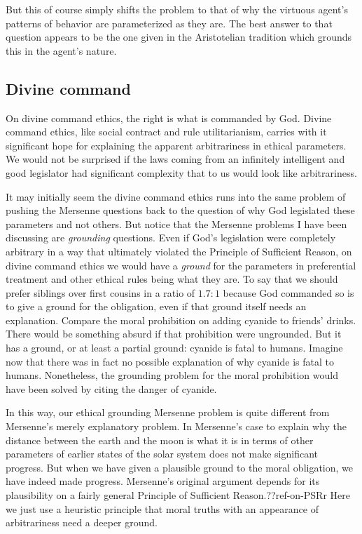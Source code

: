 But this of course simply shifts the problem to that of why the virtuous agent's patterns of behavior are parameterized as
they are. The best answer to that question appears to be the one given in the Aristotelian tradition which grounds this in
the agent's nature.

\subsection{Divine command}
On divine command ethics, the right is what is commanded by God.
Divine command ethics, like social contract and rule utilitarianism, carries with it significant hope for explaining the apparent
arbitrariness in ethical parameters. We would not be surprised if the laws coming from an infinitely intelligent and good legislator 
had significant complexity that to us would look like arbitrariness. 

It may initially seem the divine command ethics runs into the same problem of pushing the Mersenne questions back to the
question of why God legislated these parameters and not others. But notice that the Mersenne problems I have been discussing
are \textit{grounding} questions. Even if God's legislation were completely arbitrary in a way that ultimately violated the
Principle of Sufficient Reason, on divine command ethics we would have a \textit{ground} for the parameters in preferential
treatment and other ethical rules being what they are. To say that we should prefer siblings over first cousins in a ratio
of $1.7:1$ because God commanded so is to give a ground for the obligation, even if that ground itself needs an explanation.
Compare the moral prohibition on adding cyanide to friends' drinks. There would be something absurd if that prohibition were
ungrounded. But it has a ground, or at least a partial ground: cyanide is fatal to humans. Imagine now that there was in fact 
no possible explanation of why cyanide is fatal to humans. Nonetheless, the grounding problem for the moral prohibition would
have been solved by citing the danger of cyanide.

In this way, our ethical grounding Mersenne problem is quite different from Mersenne's merely explanatory problem. In Mersenne's case
to explain why the distance between the earth and the moon is what it is in terms of other parameters of earlier states of the
solar system does not make significant progress. But when we have given a plausible ground to the moral obligation, we have
indeed made progress. Mersenne's original argument depends for its plausibility on a fairly general Principle of Sufficient
Reason.??ref-on-PSRr Here we just use a heuristic principle that moral truths with
an appearance of arbitrariness need a deeper ground.

